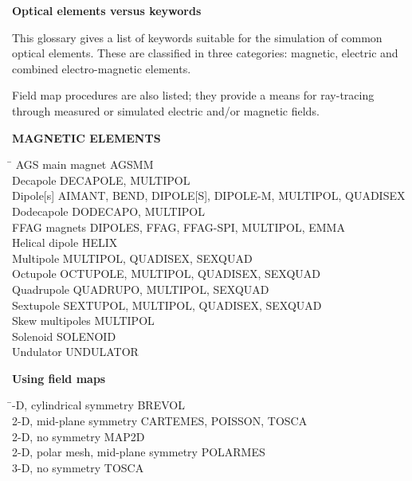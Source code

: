 
\centerline{\LARGE\textbf{Optical elements versus keywords}}
\bigskip


\noindent This glossary gives a list of keywords suitable for the 
simulation of  common optical elements. These are classified in 
three categories: magnetic, electric and combined electro-magnetic elements.

\medskip 

\noindent Field map procedures are also listed; they provide a means for ray-tracing through 
measured  or  simulated electric and/or magnetic fields. 

\bigskip


\noindent\textbf{MAGNETIC ELEMENTS} 

\begin{tabbing}
\hspace*{6cm} \= \kill
  AGS main magnet   \> AGSMM \\
  Decapole          \> DECAPOLE, MULTIPOL \\
  Dipole[s]            \> AIMANT, BEND, DIPOLE[S], DIPOLE-M, MULTIPOL, QUADISEX \\
  Dodecapole        \> DODECAPO, MULTIPOL \\
  FFAG magnets      \> DIPOLES, FFAG, FFAG-SPI, MULTIPOL, EMMA \\
  Helical dipole    \> HELIX \\
  Multipole         \> MULTIPOL, QUADISEX, SEXQUAD \\
  Octupole          \> OCTUPOLE, MULTIPOL, QUADISEX, SEXQUAD \\
  Quadrupole        \> QUADRUPO, MULTIPOL, SEXQUAD \\
  Sextupole         \> SEXTUPOL, MULTIPOL, QUADISEX, SEXQUAD \\
  Skew multipoles \> MULTIPOL \\
  Solenoid          \> SOLENOID  \\
  Undulator         \> UNDULATOR 
\end{tabbing}

\smallskip

\noindent\textbf{Using field maps}  

\begin{tabbing}
\hspace*{7cm} \= -D, cylindrical symmetry \> BREVOL \\
  2-D, mid-plane symmetry   \> CARTEMES, POISSON, TOSCA \\
  2-D, no symmetry          \> MAP2D \\
  2-D, polar mesh, mid-plane symmetry          \> POLARMES \\
  3-D, no symmetry          \> TOSCA
\end{tabbing}

